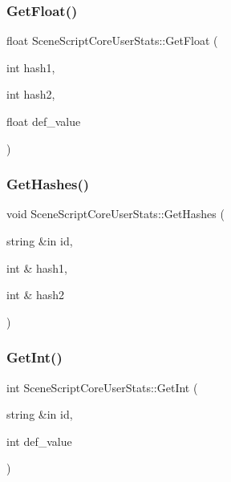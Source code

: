 \hypertarget{class_scene_script_core_user_stats_a7c4abde9412dda6a94fed7f788e97c72}{}\label{class_scene_script_core_user_stats_a7c4abde9412dda6a94fed7f788e97c72} 
\subsubsection{\texorpdfstring{Get\+Float()}{GetFloat()}\hspace{0.1cm}{\footnotesize\ttfamily [2/2]}}
{\footnotesize\ttfamily float Scene\+Script\+Core\+User\+Stats\+::\+Get\+Float (\begin{DoxyParamCaption}\item[{int}]{hash1,  }\item[{int}]{hash2,  }\item[{float}]{def\+\_\+value }\end{DoxyParamCaption})}

\hypertarget{class_scene_script_core_user_stats_ae37d1954784e2208425addc7d0db994c}{}\label{class_scene_script_core_user_stats_ae37d1954784e2208425addc7d0db994c} 
\subsubsection{\texorpdfstring{Get\+Hashes()}{GetHashes()}}
{\footnotesize\ttfamily void Scene\+Script\+Core\+User\+Stats\+::\+Get\+Hashes (\begin{DoxyParamCaption}\item[{string \&in}]{id,  }\item[{int \&}]{hash1,  }\item[{int \&}]{hash2 }\end{DoxyParamCaption})}

\hypertarget{class_scene_script_core_user_stats_aec5e5d92f72e04f82403d67e2c56d0d9}{}\label{class_scene_script_core_user_stats_aec5e5d92f72e04f82403d67e2c56d0d9} 
\subsubsection{\texorpdfstring{Get\+Int()}{GetInt()}\hspace{0.1cm}{\footnotesize\ttfamily [1/2]}}
{\footnotesize\ttfamily int Scene\+Script\+Core\+User\+Stats\+::\+Get\+Int (\begin{DoxyParamCaption}\item[{string \&in}]{id,  }\item[{int}]{def\+\_\+value }\end{DoxyParamCaption})}

